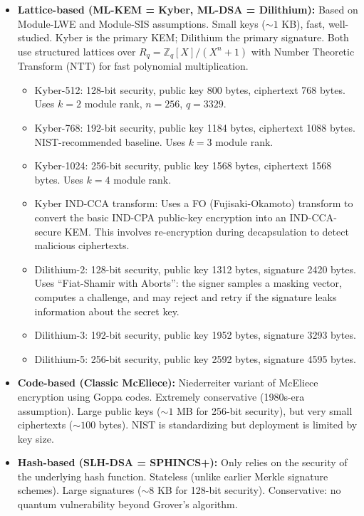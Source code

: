 \begin{itemize}
\item \textbf{Lattice-based (ML-KEM = Kyber, ML-DSA = Dilithium):} Based on Module-LWE and Module-SIS assumptions. Small keys ($\sim 1$ KB), fast, well-studied. Kyber is the primary KEM; Dilithium the primary signature. Both use structured lattices over $R_q = \mathbb{Z}_q[X]/(X^n+1)$ with Number Theoretic Transform (NTT) for fast polynomial multiplication.
  \begin{itemize}
  \item Kyber-512: 128-bit security, public key 800 bytes, ciphertext 768 bytes. Uses $k=2$ module rank, $n=256$, $q=3329$.
  \item Kyber-768: 192-bit security, public key 1184 bytes, ciphertext 1088 bytes. NIST-recommended baseline. Uses $k=3$ module rank.
  \item Kyber-1024: 256-bit security, public key 1568 bytes, ciphertext 1568 bytes. Uses $k=4$ module rank.
  \item Kyber IND-CCA transform: Uses a FO (Fujisaki-Okamoto) transform to convert the basic IND-CPA public-key encryption into an IND-CCA-secure KEM. This involves re-encryption during decapsulation to detect malicious ciphertexts.
  \item Dilithium-2: 128-bit security, public key 1312 bytes, signature 2420 bytes. Uses ``Fiat-Shamir with Aborts'': the signer samples a masking vector, computes a challenge, and may reject and retry if the signature leaks information about the secret key.
  \item Dilithium-3: 192-bit security, public key 1952 bytes, signature 3293 bytes.
  \item Dilithium-5: 256-bit security, public key 2592 bytes, signature 4595 bytes.
  \end{itemize}
\item \textbf{Code-based (Classic McEliece):} Niederreiter variant of McEliece encryption using Goppa codes. Extremely conservative (1980s-era assumption). Large public keys ($\sim 1$ MB for 256-bit security), but very small ciphertexts ($\sim 100$ bytes). NIST is standardizing but deployment is limited by key size.

\item \textbf{Hash-based (SLH-DSA = SPHINCS+):} Only relies on the security of the underlying hash function. Stateless (unlike earlier Merkle signature schemes). Large signatures ($\sim 8$ KB for 128-bit security). Conservative: no quantum vulnerability beyond Grover's algorithm.


\end{itemize}
